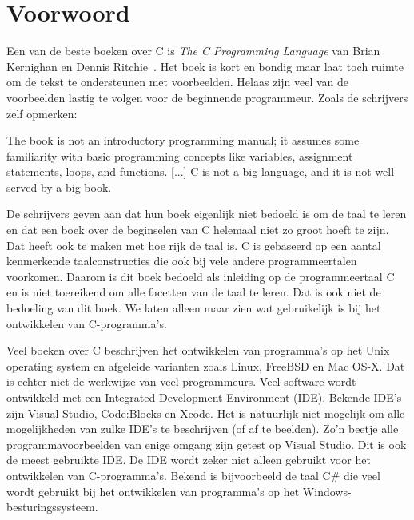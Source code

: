 

\chapter{Voorwoord}
\label{cha:voorwoord}
\thispagestyle{empty}

Een van de beste boeken over C is
\textsl{The C Programming Language} van Brian Kernighan en Dennis
Ritchie~\cite{kernighan1988c}. Het boek is kort en bondig maar laat toch
ruimte om de tekst te ondersteunen met voorbeelden. Helaas zijn veel van
de voorbeelden lastig te volgen voor de beginnende programmeur. Zoals de
schrijvers zelf opmerken:

\begin{displayquote}
The book is not an introductory programming manual; it assumes some familiarity
with basic programming concepts like variables, assignment statements,
loops, and functions.
[...]
C is not a big language, and it is not well served by a big book.
\end{displayquote}

De schrijvers geven aan dat hun boek eigenlijk niet bedoeld is om de taal te leren
en dat een boek over de beginselen van C helemaal niet zo groot hoeft te zijn.
Dat heeft ook te maken met hoe rijk de taal is. C is gebaseerd op een aantal
kenmerkende taalconstructies die ook bij vele andere programmeertalen voorkomen.
Daarom is dit boek bedoeld als inleiding op de programmeertaal C en is niet
toereikend om alle facetten van de taal te leren. Dat is ook niet de
bedoeling van dit boek. We laten alleen maar zien wat gebruikelijk is bij
het ontwikkelen van C-programma's. 

Veel boeken over C beschrijven het ontwikkelen van programma's op het Unix
operating system en afgeleide varianten zoals Linux, FreeBSD en Mac OS-X.
Dat is echter niet de werkwijze van veel programmeurs. Veel software wordt
ontwikkeld met een Integrated Development Environment (IDE). Bekende IDE's
zijn Visual Studio, Code:Blocks en Xcode. Het is natuurlijk niet mogelijk
om alle mogelijkheden van zulke IDE's te beschrijven (of af te beelden).
Zo'n beetje alle programmavoorbeelden van enige omgang zijn getest op
Visual Studio. Dit is ook de meest gebruikte IDE. De IDE wordt zeker niet
alleen gebruikt voor het ontwikkelen van C-programma's. Bekend is bijvoorbeeld
de taal C\# die veel wordt gebruikt bij het ontwikkelen van programma's op
het Windows-besturingssysteem.

